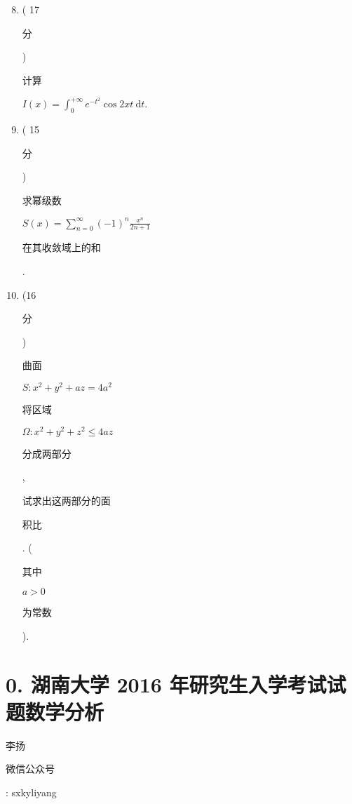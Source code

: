 \documentclass[10pt]{article}
\begin{document}
\begin{enumerate}
  \setcounter{enumi}{7}
  \item ( 17 \begin{CJK}{UTF8}{mj}分\end{CJK}) \begin{CJK}{UTF8}{mj}计算\end{CJK} $I(x)=\int_{0}^{+\infty} e^{-t^{2}} \cos 2 x t \mathrm{~d} t$.

  \item ( 15 \begin{CJK}{UTF8}{mj}分\end{CJK}) \begin{CJK}{UTF8}{mj}求幂级数\end{CJK} $S(x)=\sum_{n=0}^{\infty}(-1)^{n} \frac{x^{n}}{2 n+1}$ \begin{CJK}{UTF8}{mj}在其收敛域上的和\end{CJK}.

  \item (16 \begin{CJK}{UTF8}{mj}分\end{CJK}) \begin{CJK}{UTF8}{mj}曲面\end{CJK} $S: x^{2}+y^{2}+a z=4 a^{2}$ \begin{CJK}{UTF8}{mj}将区域\end{CJK} $\Omega: x^{2}+y^{2}+z^{2} \leqslant 4 a z$ \begin{CJK}{UTF8}{mj}分成两部分\end{CJK}, \begin{CJK}{UTF8}{mj}试求出这两部分的面\end{CJK} \begin{CJK}{UTF8}{mj}积比\end{CJK}. (\begin{CJK}{UTF8}{mj}其中\end{CJK} $a>0$ \begin{CJK}{UTF8}{mj}为常数\end{CJK}).

\end{enumerate}
\section{0. 湖南大学 2016 年研究生入学考试试题数学分析}
\begin{CJK}{UTF8}{mj}李扬\end{CJK}

\begin{CJK}{UTF8}{mj}微信公众号\end{CJK}: sxkyliyang
\end{document}
